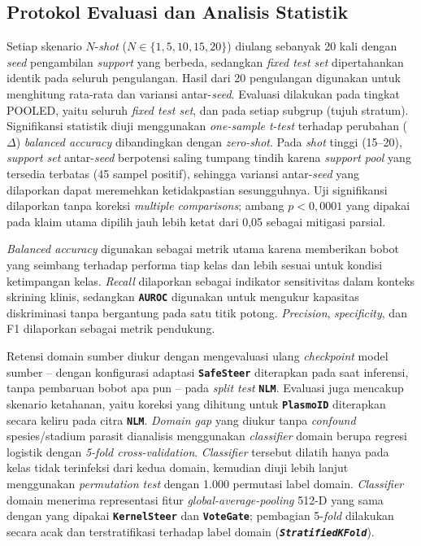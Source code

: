 \documentclass[conference]{IEEEtran}
\newcommand{\nama}[1]{\textbf{\texttt{#1}}}
\begin{document}
\subsection{Protokol Evaluasi dan Analisis Statistik}
Setiap skenario $N$-\textit{shot} ($N\in\{1,5,10,15,20\}$) diulang sebanyak 20 kali dengan \textit{seed} pengambilan \textit{support} yang berbeda, sedangkan \textit{fixed test set} dipertahankan identik pada seluruh pengulangan. Hasil dari 20 pengulangan digunakan untuk menghitung rata-rata dan variansi antar-\textit{seed}. Evaluasi dilakukan pada tingkat POOLED, yaitu seluruh \textit{fixed test set}, dan pada setiap subgrup (tujuh stratum). Signifikansi statistik diuji menggunakan \textit{one-sample t-test} terhadap perubahan ($\Delta$) \textit{balanced accuracy} dibandingkan dengan \textit{zero-shot}. Pada \textit{shot} tinggi (15--20), \textit{support set} antar-\textit{seed} berpotensi saling tumpang tindih karena \textit{support pool} yang tersedia terbatas (45 sampel positif), sehingga variansi antar-\textit{seed} yang dilaporkan dapat meremehkan ketidakpastian sesungguhnya. Uji signifikansi dilaporkan tanpa koreksi \textit{multiple comparisons}; ambang $p<0{,}0001$ yang dipakai pada klaim utama dipilih jauh lebih ketat dari 0,05 sebagai mitigasi parsial.

\textit{Balanced accuracy} digunakan sebagai metrik utama karena memberikan bobot yang seimbang terhadap performa tiap kelas dan lebih sesuai untuk kondisi ketimpangan kelas. \textit{Recall} dilaporkan sebagai indikator sensitivitas dalam konteks skrining klinis, sedangkan \nama{AUROC} digunakan untuk mengukur kapasitas diskriminasi tanpa bergantung pada satu titik potong. \textit{Precision}, \textit{specificity}, dan F1 dilaporkan sebagai metrik pendukung.

Retensi domain sumber diukur dengan mengevaluasi ulang \textit{checkpoint} model sumber -- dengan konfigurasi adaptasi \nama{SafeSteer} diterapkan pada saat inferensi, tanpa pembaruan bobot apa pun -- pada \textit{split test} \nama{NLM}. Evaluasi juga mencakup skenario ketahanan, yaitu koreksi yang dihitung untuk \nama{PlasmoID} diterapkan secara keliru pada citra \nama{NLM}. \textit{Domain gap} yang diukur tanpa \textit{confound} spesies/stadium parasit dianalisis menggunakan \textit{classifier} domain berupa regresi logistik dengan \textit{5-fold cross-validation}. \textit{Classifier} tersebut dilatih hanya pada kelas tidak terinfeksi dari kedua domain, kemudian diuji lebih lanjut menggunakan \textit{permutation test} dengan 1.000 permutasi label domain. \textit{Classifier} domain menerima representasi fitur \textit{global-average-pooling} 512-D yang sama dengan yang dipakai \nama{KernelSteer} dan \nama{VoteGate}; pembagian 5-\textit{fold} dilakukan secara acak dan terstratifikasi terhadap label domain (\textit{\nama{StratifiedKFold}}).
\end{document}
